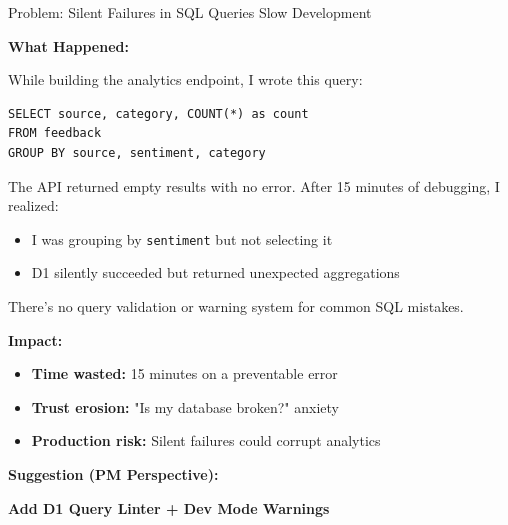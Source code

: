\documentclass[11pt,a4paper]{article}
\begin{document}
\begin{insightbox}{Problem: Silent Failures in SQL Queries Slow Development}

\textbf{What Happened:}

While building the analytics endpoint, I wrote this query:

\begin{verbatim}
SELECT source, category, COUNT(*) as count
FROM feedback
GROUP BY source, sentiment, category
\end{verbatim}

The API returned empty results with no error. After 15 minutes of debugging, I realized:
\begin{itemize}
    \item I was grouping by \texttt{sentiment} but not selecting it
    \item D1 silently succeeded but returned unexpected aggregations
\end{itemize}

There's no query validation or warning system for common SQL mistakes.

\vspace{0.5em}

\textbf{Impact:}
\begin{itemize}
    \item \textbf{Time wasted:} 15 minutes on a preventable error
    \item \textbf{Trust erosion:} "Is my database broken?" anxiety
    \item \textbf{Production risk:} Silent failures could corrupt analytics
\end{itemize}

\end{insightbox}

\textbf{Suggestion (PM Perspective):}

\textcolor{cfOrange}{\textbf{Add D1 Query Linter + Dev Mode Warnings}}
\end{document}
